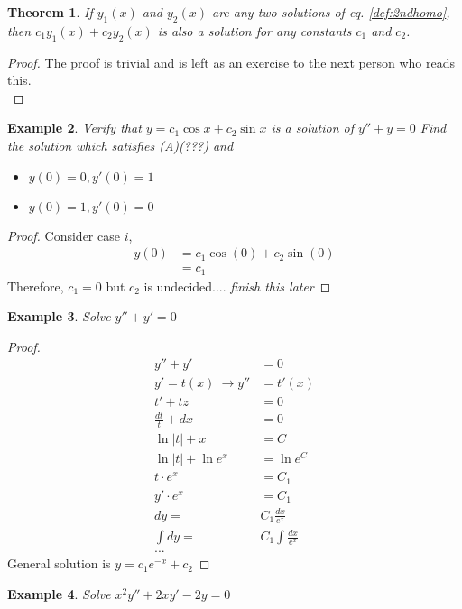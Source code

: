 \documentclass[oneside,11pt,pdftex,final]{book}%
\numberwithin{equation}{section}
\newtheorem{theorem}{Theorem}[chapter]%
\newtheorem{example}[theorem]{Example}
\numberwithin{section}{chapter}
\numberwithin{equation}{chapter}
\begin{document}
\begin{theorem}
	If $ y_1(x) $ and $ y_2(x) $ are any two solutions of eq. \ref{def:2ndhomo}, then $ c_1y_1(x) +c_2 y_2 (x)$ is also a solution for any constants $ c_1 $ and $ c_2 $.
\end{theorem}
\begin{proof}
	The proof is trivial and is left as an exercise to the next person who reads this.\\
\end{proof}

\begin{example}
	Verify that $ y=c_1 \cos x + c_2 \sin x $ is a solution of $ y''+y=0 $ Find the solution which satisfies (A)(???) and
	\begin{itemize}
		\item $ y(0) =0, y'(0)=1$
		\item $ y(0)=1, y'(0)=0 $
	\end{itemize}
\end{example}

\begin{proof}
	Consider case $ i $,
	\begin{align*}
		y(0)&=c_1 \cos (0)+ c_2 \sin (0)\\
		&=c_1
	\end{align*}
	Therefore, $ c_1=0 $ but $ c_2 $ is undecided.... \emph{finish this later}
\end{proof}

\begin{example}
	Solve $ y''+y'=0 $
\end{example}
\begin{proof}
	\begin{align*}
	y''+y'&=0 \\ 
	y'=t(x) \ \to y''&=t'(x) 
	\\ t'+tz&=0 \\ 
	\frac{dt}{t}+dx&=0 \\
	 \ln |t|+x&=C \\ 
	 \ln|t| + \ln e^x &= \ln e^{C} \\ 
	 t \cdot  e^x&=C_1 \\ 
	 y' \cdot e^x &=C_1 \\ 
	 dy=&C_1\frac{dx}{e^x} \\ 
	 \int dy=&C_1 \int \frac{dx}{e^x} \\ ...
	\end{align*}
General solution is $ y=c_1e^{-x}+c_2 $	
\end{proof}

\begin{example}
	Solve $ x^2y''+2xy'-2y=0 $
\end{example}
\end{document}
